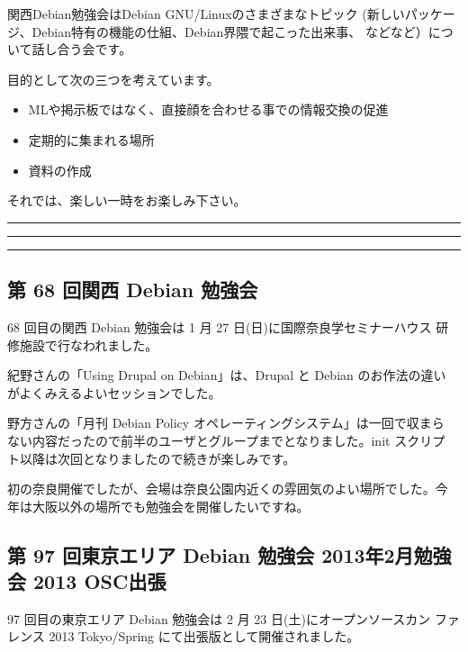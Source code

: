 \documentclass[mingoth,a4paper]{jsarticle}
\begin{document}
 関西Debian勉強会はDebian GNU/Linuxのさまざまなトピック
 (新しいパッケージ、Debian特有の機能の仕組、Debian界隈で起こった出来事、
 などなど）について話し合う会です。

 目的として次の三つを考えています。
 \begin{itemize}
  \item MLや掲示板ではなく、直接顔を合わせる事での情報交換の促進
  \item 定期的に集まれる場所
  \item 資料の作成
 \end{itemize}

 それでは、楽しい一時をお楽しみ下さい。

\newpage

\begin{minipage}[b]{0.2\hsize}
 {}
\end{minipage}
\begin{minipage}[b]{0.8\hsize}
\hrule
\vspace{2mm}
\hrule
\setcounter{tocdepth}{1}
\tableofcontents
\vspace{2mm}
\hrule
\end{minipage}


\subsection{第 68 回関西 Debian 勉強会}

68 回目の関西 Debian 勉強会は 1 月 27 日(日)に国際奈良学セミナーハウス
研修施設で行なわれました。

紀野さんの「Using Drupal on Debian」は、Drupal と Debian のお作法の違い
がよくみえるよいセッションでした。

野方さんの「月刊 Debian Policy オペレーティングシステム」は一回で収まら
ない内容だったので前半のユーザとグループまでとなりました。init スクリプ
ト以降は次回となりましたので続きが楽しみです。

初の奈良開催でしたが、会場は奈良公園内近くの雰囲気のよい場所でした。今
年は大阪以外の場所でも勉強会を開催したいですね。


\subsection{第 97 回東京エリア Debian 勉強会 2013年2月勉強会 2013 OSC出張}

97 回目の東京エリア Debian 勉強会は 2 月 23 日(土)にオープンソースカン
ファレンス 2013 Tokyo/Spring にて出張版として開催されました。
\end{document}
